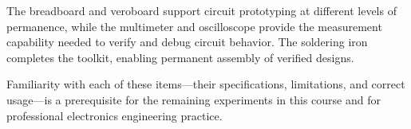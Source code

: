 \documentclass[12pt, a4paper, twoside]{report}
\begin{document}
The breadboard and veroboard support circuit prototyping at different levels of
permanence, while the multimeter and oscilloscope provide the measurement capability
needed to verify and debug circuit behavior. The soldering iron completes the toolkit,
enabling permanent assembly of verified designs.

Familiarity with each of these items---their specifications, limitations, and correct
usage---is a prerequisite for the remaining experiments in this course and for
professional electronics engineering practice.


\vspace{1.5cm}


\end{document}
